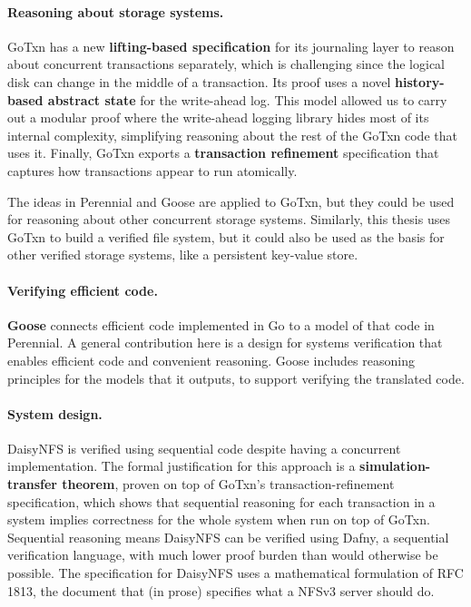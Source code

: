 \paragraph{Reasoning about storage systems.}
GoTxn has a new \textbf{lifting-based specification} for its journaling
layer to reason about concurrent transactions separately, which is
challenging since the logical disk can change in the middle of a transaction. Its proof uses a novel
\textbf{history-based abstract state} for the write-ahead log. This model allowed us to carry
out a modular proof where the write-ahead logging library hides most of
its internal complexity, simplifying reasoning about the rest of the GoTxn
code that uses it. Finally, GoTxn exports a \textbf{transaction refinement}
specification that captures how transactions appear to run atomically.

The ideas in Perennial and Goose are applied to GoTxn, but they could be used
for reasoning about other concurrent storage systems. Similarly,
this thesis uses GoTxn to build a verified file system, but it could also be used
as the basis for other verified storage systems, like a persistent key-value
store.

\paragraph{Verifying efficient code.}
\textbf{Goose} connects efficient code implemented in Go to a model of that code
in Perennial. A general contribution here is a design for systems verification
that enables efficient code and convenient reasoning. Goose includes reasoning
principles for the models that it outputs, to support verifying the translated
code.

\paragraph{System design.}
DaisyNFS is verified using sequential code despite having a concurrent
implementation. The formal justification for this approach is a
\textbf{simulation-transfer theorem}, proven on top of GoTxn's
transaction-refinement specification, which shows that sequential reasoning for each
transaction in a system implies correctness for the whole system when run on top
of GoTxn. Sequential reasoning means DaisyNFS can be verified using Dafny, a
sequential verification language, with much lower proof burden than would
otherwise be possible. The specification for DaisyNFS uses a mathematical
formulation of RFC 1813, the document that (in prose) specifies what a NFSv3
server should do.

